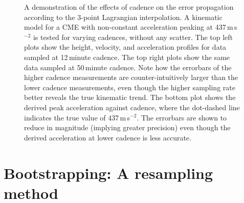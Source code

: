 \documentclass[referee]{aa}
\begin{document}
\begin{figure}[!ht]
\caption{A demonstration of the effects of cadence on the error propagation according to the 3-point Lagrangian interpolation. A kinematic model for a CME with non-constant acceleration peaking at 437\,m\,s$^{-2}$ is tested for varying cadences, without any scatter. The top left plots show the height, velocity, and acceleration profiles for data sampled at 12\,minute cadence. The top right plots show the same data sampled at 50\,minute cadence. Note how the errorbars of the higher cadence measurements are counter-intuitively larger than the lower cadence measurements, even though the higher sampling rate better reveals the true kinematic trend. The bottom plot shows the derived peak acceleration against cadence, where the dot-dashed line indicates the true value of 437\,m\,s$^{-2}$. The errorbars are shown to reduce in magnitude (implying greater precision) even though the derived acceleration at lower cadence is less accurate.}
\label{fig_cadence_hva}
\end{figure}


\section{Bootstrapping: A resampling method}
\label{sect:bootstrapping}
\end{document}
